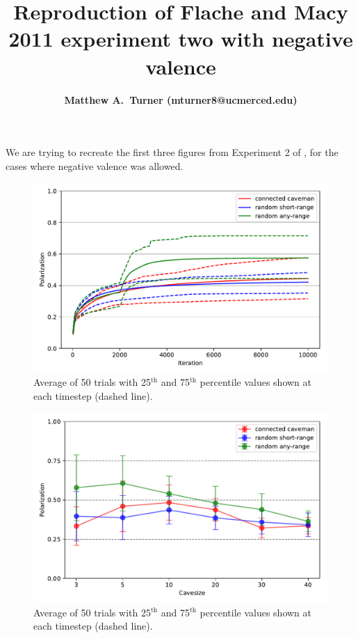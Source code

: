 \documentclass[11pt,letterpaper]{article}
\title{Reproduction of Flache and Macy 2011 experiment two with negative valence}
\author{{\bf Matthew A.~Turner (mturner8@ucmerced.edu)}}
\begin{document}
\maketitle

We are trying to recreate the first three figures from Experiment 2 of ,
for the cases where negative valence was allowed.

\begin{figure}
\begin{center}
  \includegraphics[width=\textwidth]{Figures/figure10b.pdf}
\end{center}
  \caption{Average of 50 trials with 25$^{\mathrm{th}}$ and 75$^{\mathrm{th}}$ percentile values
    shown at each timestep (dashed line).}
\label{fig:}
\end{figure}

\begin{figure}
\begin{center}
  \includegraphics[width=\textwidth]{Figures/figure11b.pdf}
\end{center}
  \caption{Average of 50 trials with 25$^{\mathrm{th}}$ and 75$^{\mathrm{th}}$ percentile values
    shown at each timestep (dashed line).}
\label{fig:}
\end{figure}
\end{document}
